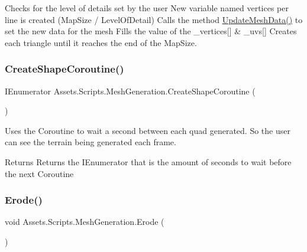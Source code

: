 Checks for the level of details set by the user New variable named vertices per line is created (Map\+Size / Level\+Of\+Detail) Calls the method \mbox{\hyperlink{class_assets_1_1_scripts_1_1_mesh_generation_abaeb22e0f390a218be5d9543138f52b9}{Update\+Mesh\+Data()}} to set the new data for the mesh Fills the value of the \+\_\+vertices\mbox{[}\mbox{]} \& \+\_\+uvs\mbox{[}\mbox{]} Creates each triangle until it reaches the end of the Map\+Size. 

\mbox{\label{class_assets_1_1_scripts_1_1_mesh_generation_a533ee7b8be835fa3b6f6282e86fd9ec6}} 
\subsubsection{\texorpdfstring{CreateShapeCoroutine()}{CreateShapeCoroutine()}}
{\footnotesize\ttfamily I\+Enumerator Assets.\+Scripts.\+Mesh\+Generation.\+Create\+Shape\+Coroutine (\begin{DoxyParamCaption}{ }\end{DoxyParamCaption})}



Uses the Coroutine to wait a second between each quad generated. So the user can see the terrain being generated each frame. 

\begin{DoxyReturn}{Returns}
Returns the I\+Enumerator that is the amount of seconds to wait before the next Coroutine
\end{DoxyReturn}
\mbox{\label{class_assets_1_1_scripts_1_1_mesh_generation_a4ca64ff2f5c1b7f9073699905628e6dd}} 
\subsubsection{\texorpdfstring{Erode()}{Erode()}}
{\footnotesize\ttfamily void Assets.\+Scripts.\+Mesh\+Generation.\+Erode (\begin{DoxyParamCaption}{ }\end{DoxyParamCaption})}



